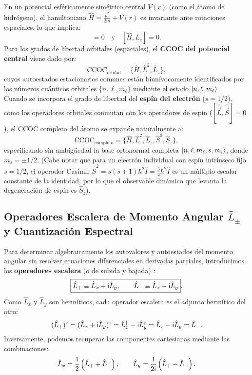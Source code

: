 En un potencial esféricamente simétrico central $V(r)$ (como el átomo de hidrógeno), el hamiltoniano $\hat{H} = \frac{\hat{p}^2}{2m} + V(r)$ es invariante ante rotaciones espaciales, lo que implica:
\begin{equation}
    [\hat{H}, \hat{L}^2] = 0 \quad \text{y} \quad [\hat{H}, \hat{L}_z] = 0.
\end{equation}
Para los grados de libertad orbitales (espaciales), el \textbf{CCOC del potencial central} viene dado por:
\begin{equation}
    \boxed{\text{CCOC}_{\text{orbital}} = \{\hat{H}, \hat{L}^2, \hat{L}_z\}},
\end{equation}
cuyos autoestados estacionarios comunes están biunívocamente identificados por los números cuánticos orbitales $\{n, \ell, m_\ell\}$ mediante el estado $\left| n, \ell, m_\ell \right\rangle$ \cite{cohen, zettili}.\\
Cuando se incorpora el grado de libertad del \textbf{espín del electrón} ($s = 1/2$), como los operadores orbitales conmutan con los operadores de espín ($[\hat{\vec{L}}, \hat{\vec{S}}] = 0$), el CCOC completo del átomo se expande naturalmente a:
\begin{equation}
    \boxed{\text{CCOC}_{\text{completo}} = \{\hat{H}, \hat{L}^2, \hat{L}_z, \hat{S}^2, \hat{S}_z\}},
\end{equation}
especificando sin ambigüedad la base ortonormal completa $\left| n, \ell, m_\ell, s, m_s \right\rangle$, donde $m_s = \pm 1/2$. (Cabe notar que para un electrón individual con espín intrínseco fijo $s=1/2$, el operador Casimir $\hat{S}^2 = s(s+1)\hbar^2\hat{I} = \frac{3}{4}\hbar^2\hat{I}$ es un múltiplo escalar constante de la identidad, por lo que el observable dinámico que levanta la degeneración de espín es $\hat{S}_z$).

\subsection{Operadores Escalera de Momento Angular \texorpdfstring{$\hat{L}_\pm$}{L+-} y Cuantización Espectral}
\label{subsec:operadores_escalera}

Para determinar algebraicamente los autovalores y autoestados del momento angular sin resolver ecuaciones diferenciales en derivadas parciales, introducimos los \textbf{operadores escalera} (o de subida y bajada) \cite{sakurai, zettili}:
\begin{equation}
    \boxed{\hat{L}_+ \equiv \hat{L}_x + \mathrm{i}\hat{L}_y, \qquad \hat{L}_- \equiv \hat{L}_x - \mathrm{i}\hat{L}_y}.
    \label{eq:ladder_def}
\end{equation}
Como $\hat{L}_x$ y $\hat{L}_y$ son hermíticos, cada operador escalera es el adjunto hermítico del otro:
\begin{equation}
    (\hat{L}_+)^\dagger = (\hat{L}_x + \mathrm{i}\hat{L}_y)^\dagger = \hat{L}_x^\dagger - \mathrm{i}\hat{L}_y^\dagger = \hat{L}_x - \mathrm{i}\hat{L}_y = \hat{L}_-.
\end{equation}
Inversamente, podemos recuperar las componentes cartesianas mediante las combinaciones:
\begin{equation}
    \hat{L}_x = \frac{1}{2}\left(\hat{L}_+ + \hat{L}_-\right), \qquad \hat{L}_y = \frac{1}{2\mathrm{i}}\left(\hat{L}_+ - \hat{L}_-\right).
\end{equation}

